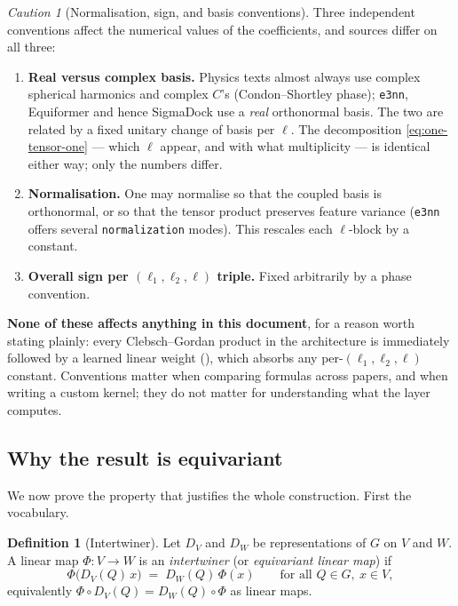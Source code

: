 \documentclass[11pt,a4paper]{report}
\theoremstyle{definition}
\newtheorem{definition}[definition]{Definition}
\theoremstyle{remark}
\newtheorem{caution}[caution]{Caution}
\begin{document}
\begin{caution}[Normalisation, sign, and basis conventions]
\label{caution:cg-conventions}
Three independent conventions affect the numerical values of the
coefficients, and sources differ on all three:
\begin{enumerate}[nosep,label=(\roman*)]
\item \textbf{Real versus complex basis.} Physics texts almost always use
complex spherical harmonics and complex $C$'s (Condon--Shortley phase);
\texttt{e3nn}, Equiformer and hence SigmaDock use a \emph{real}
orthonormal basis. The two are related by a fixed unitary change of basis
per $\ell$. The decomposition \eqref{eq:one-tensor-one} --- which $\ell$
appear, and with what multiplicity --- is identical either way; only the
numbers differ.
\item \textbf{Normalisation.} One may normalise so that the coupled basis is
orthonormal, or so that the tensor product preserves feature variance
(\texttt{e3nn} offers several \texttt{normalization} modes). This rescales
each $\ell$-block by a constant.
\item \textbf{Overall sign per $(\ell_1,\ell_2,\ell)$ triple.} Fixed
arbitrarily by a phase convention.
\end{enumerate}
\textbf{None of these affects anything in this document}, for a reason worth
stating plainly: every Clebsch--Gordan product in the architecture is
immediately followed by a learned linear weight
(), which absorbs any per-$(\ell_1,\ell_2,\ell)$ constant.
Conventions matter when comparing formulas across papers, and when writing a
custom kernel; they do not matter for understanding what the layer computes.
\end{caution}

\subsection{Why the result is equivariant}
\label{sec:cg-equivariance-proof}

We now prove the property that justifies the whole construction. First the
vocabulary.

\begin{definition}[Intertwiner]
\label{def:intertwiner}
Let $D_V$ and $D_W$ be representations of $G$ on $V$ and $W$. A linear map
$\Phi:V\to W$ is an \emph{intertwiner} (or \emph{equivariant linear map}) if
\[
\Phi\bigl(D_V(Q)\,x\bigr) \;=\; D_W(Q)\,\Phi(x)
\qquad\text{for all } Q\in G,\ x\in V ,
\]
equivalently $\Phi\circ D_V(Q) = D_W(Q)\circ\Phi$ as linear maps.
\end{definition}
\end{document}
